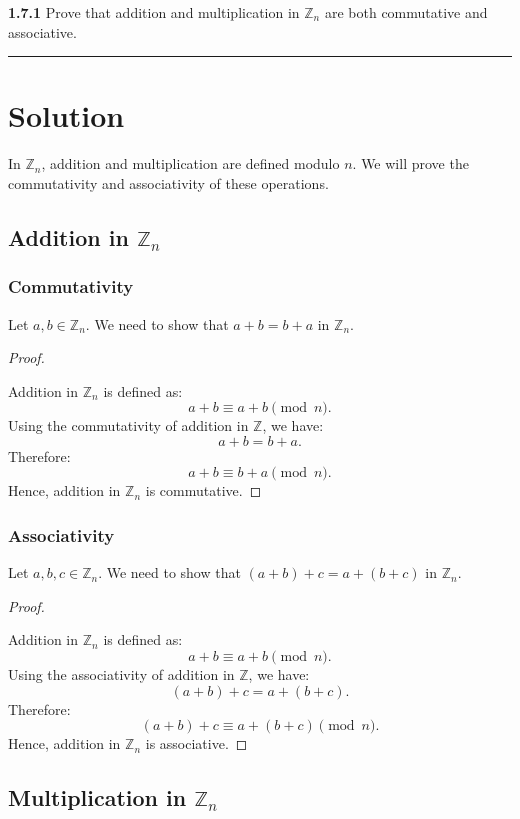 \documentclass[12pt]{amsart}
\theoremstyle{definition}
\numberwithin{equation}{section}
\newcommand{\Z}{\mathbb{Z}}
\begin{document}
\newpage
\begin{exercise}{\textbf{1.7.1}} Prove that addition and multiplication in \(\Z_n\) are both commutative and associative.
    
    \noindent\rule{\linewidth}{1pt}

    \vspace*{-10pt}\section*{Solution}

In \(\mathbb{Z}_n\), addition and multiplication are defined modulo \(n\). We will prove the commutativity and associativity of these operations.

\subsection*{Addition in \(\mathbb{Z}_n\)}

\subsubsection*{Commutativity}
Let \(a, b \in \mathbb{Z}_n\). We need to show that \(a + b = b + a\) in \(\mathbb{Z}_n\).
\begin{proof} \( \)

Addition in \(\mathbb{Z}_n\) is defined as:
\[
a + b \equiv a + b \pmod{n}.
\]
Using the commutativity of addition in \(\mathbb{Z}\), we have:
\[
a + b = b + a.
\]
Therefore:
\[
a + b \equiv b + a \pmod{n}.
\]
Hence, addition in \(\mathbb{Z}_n\) is commutative.
\end{proof}

\subsubsection*{Associativity}
Let \(a, b, c \in \mathbb{Z}_n\). We need to show that \((a + b) + c = a + (b + c)\) in \(\mathbb{Z}_n\).
\begin{proof} \( \)

Addition in \(\mathbb{Z}_n\) is defined as:
\[
a + b \equiv a + b \pmod{n}.
\]
Using the associativity of addition in \(\mathbb{Z}\), we have:
\[
(a + b) + c = a + (b + c).
\]
Therefore:
\[
(a + b) + c \equiv a + (b + c) \pmod{n}.
\]
Hence, addition in \(\mathbb{Z}_n\) is associative.
\end{proof}
\pagebreak
\subsection*{Multiplication in \(\mathbb{Z}_n\)}


\end{exercise}
\end{document}
